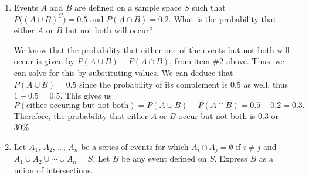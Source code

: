 \documentclass{article}
\begin{document}
\begin{enumerate}
\begin{proof}[Explanation]
        At first glance, this might seem true because \(A_1\), \(A_2\), and \(A_3\) all have the same probability of rolling a 6, which is \(\frac{1}{6}\), so multiplying this
        probability by 3 gives us \(\frac{1}{2}\). However, this wouldn't represent \(P(A_1\cup{}A_2\cup{}A_3)\), because these events are not mutually exclusive. You can roll a 6
        on any one of these dice and still get a 6 on another. We can only add probabilities like that for unions when they are exclusive from each other.\par 
        Rather, this probability should be interpreted as the probability that 
        \textit{at least} one of the dice shows up as 6. The only way this wont happen is if all of them aren't 6, which we can interpret as \(P(A_1^C\cap{}A_2^C\cap{}A_3^C)\). 
        Subtracting this by 1 should give us the probability of \(A_1\cup{}A_2\cup{}A_3\). Thus,\[
            P(A_1\cup{}A_2\cup{}A_3) = 1 - P(A_1^C\cap{}A_2^C\cap{}A_3^C) = 1 - {\biggl(\frac{5}{6}\biggr)}^3 \neq \frac{1}{2},
        \] which proves the statement is false. 
    \end{proof}
    Note that you could also solve this by using the expansion given by \textbf{Theorem 2.3.7}, but this way is a little bit more intuitive (just a little bit more). It 
    \textit{should} give the same answer as the one above. 
    \item Events \(A\) and \(B\) are defined on a sample space \(S\) such that \(P\bigl({(A\cup{}B)}^C\bigr) =0.5\) and \(P(A\cap{}B) = 0.2\). What is
    the probability that either \(A\) or \(B\) but not both will occur?\begin{solution}
        We know that the probability that either one of the events but not both will occur is given by \(P(A\cup{}B) - P(A\cap{}B)\), from item \#2 above. Thus, we can solve
        for this by substituting values. We can deduce that \(P(A\cup{}B) = 0.5 \) since the probability of its complement is 0.5 as well, thus \(1 - 0.5 = 0.5\). This gives us\[
            P(\text{either occuring but not both}) = P(A\cup{}B) - P(A\cap{}B) = 0.5 - 0.2 = 0.3. 
        \] Therefore, the probability that either \(A\) or \(B\) occur but not both is 0.3 or 30\%. 
    \end{solution}
    \item Let \(A_1\), \(A_2\), \ldots, \(A_n\) be a series of events for which \(A_i \cap{}A_j = \emptyset\) if \(i\neq{}j\) and \(A_1\cup{}A_2\cup\cdots{}\cup{}A_n = S\). 
    Let \(B\) be any event defined on \(S\). Express \(B\) as a union of intersections.\begin{solution}

\end{solution}
\end{enumerate}
\end{document}
